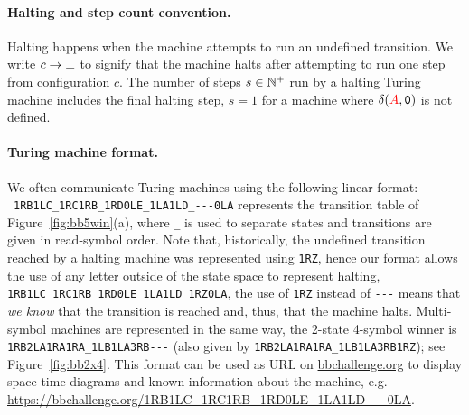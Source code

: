 \vspace{-1ex}
\paragraph{Halting and step count convention.} Halting happens when the machine attempts to run an undefined transition. We write $c \to \bot$ to signify that the machine halts after attempting to run one step from configuration $c$. The number of steps $s\in \mathbb{N}^+$ run by a halting Turing machine includes the final halting step, \eg $s = 1$ for a machine where $\delta(\stateA,\symbolzero)$ is not defined.



\vspace{-1ex}
\paragraph*{Turing machine format.} We often communicate Turing machines using the following linear format: \\ \verb|1RB1LC_1RC1RB_1RD0LE_1LA1LD_---0LA| represents the transition table of Figure~\ref{fig:bb5win}(a), where \texttt{\_} is used to separate states and transitions are given in read-symbol order. Note that, historically, the undefined transition reached by a halting machine was represented using \texttt{1RZ}, hence our format allows the use of any letter outside of the state space to represent halting, \eg \texttt{1RB1LC\_1RC1RB\_1RD0LE\_1LA1LD\_1RZ0LA}, the use of \texttt{1RZ} instead of \verb|---| means that \textit{we know} that the transition is reached and, thus, that the machine halts. Multi-symbol machines are represented in the same way, \eg the 2-state 4-symbol \BBfull winner is \verb|1RB2LA1RA1RA_1LB1LA3RB---| (also given by \texttt{1RB2LA1RA1RA\_1LB1LA3RB1RZ}); see Figure~\ref{fig:bb2x4}. This format can be used as URL on \url{bbchallenge.org} to display space-time diagrams and known information about the machine, e.g. \url{https://bbchallenge.org/1RB1LC\_1RC1RB\_1RD0LE\_1LA1LD\_---0LA}.

\vspace{-1ex}
